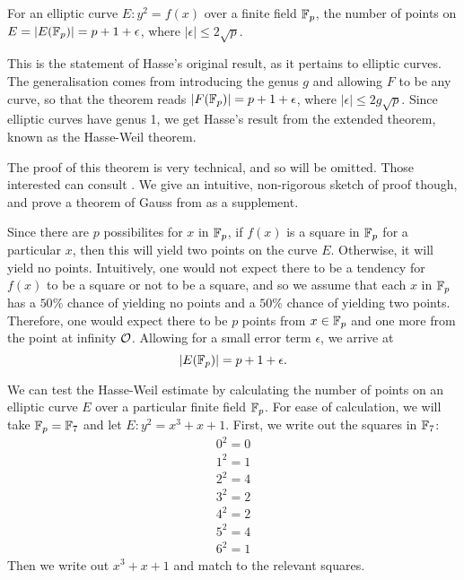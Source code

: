 
\begin{theorem}
	For an elliptic curve $E: y^2 = f(x)$ over a finite field $\fp$, the number of points on $E = |E(\fp)| = p + 1 + \epsilon$, where $|\epsilon| \leq 2\sqrt{p}$.\cite{tate2013}
\end{theorem}
This is the statement of Hasse's original result, as it pertains to elliptic curves.
The generalisation comes from introducing the genus $g$ and allowing $F$ to be any curve, so that the theorem reads $|F(\fp)| = p + 1 + \epsilon$, where $|\epsilon| \leq 2g\sqrt{p}$.
Since elliptic curves have genus 1, we get Hasse's result from the extended theorem, known as the Hasse-Weil theorem.
\begin{sproof}
	The proof of this theorem is very technical, and so will be omitted.
	Those interested can consult \cite{hasse1936a,hasse1936b,hasse1936c}.
	We give an intuitive, non-rigorous sketch of proof though, and prove a theorem of Gauss from \cite{tate2013} as a supplement.

	Since there are $p$ possibilites for $x$ in $\fp$, if $f(x)$ is a square in $\fp$ for a particular $x$, then this will yield two points on the curve $E$.
	Otherwise, it will yield no points.
	Intuitively, one would not expect there to be a tendency for $f(x)$ to be a square or not to be a square, and so we assume that each $x$ in $\fp$ has a $50\%$ chance of yielding no points and a $50\%$ chance of yielding two points.
	Therefore, one would expect there to be $p$ points from $x \in \fp$ and one more from the point at infinity $\pai$.
	Allowing for a small error term $\epsilon$, we arrive at
	$$|E(\fp)| = p + 1 + \epsilon.$$
\end{sproof}
We can test the Hasse-Weil estimate by calculating the number of points on an elliptic curve $E$ over a particular finite field $\fp$.
For ease of calculation, we will take $\fp = \fp[7]$ and let $E : y^2 = x^3 + x + 1$.
First, we write out the squares in $\fp[7]$:
\begin{align*}
0^2 = 0\\
1^2 = 1\\
2^2 = 4\\
3^2 = 2\\
4^2 = 2\\
5^2 = 4\\
6^2 = 1
\end{align*}
Then we write out $x^3+x+1$ and match to the relevant squares.

